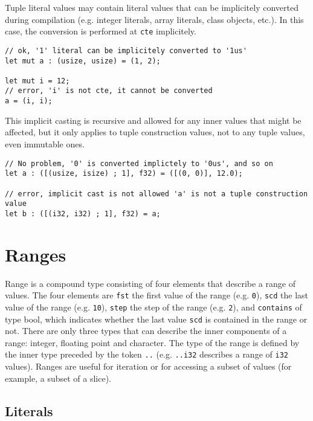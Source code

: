 Tuple literal values may contain literal values that can be implicitely converted during compilation (e.g. integer literals, array literals, class objects, etc.). In this case, the conversion is performed at \texttt{cte} implicitely.

\begin{lstlisting}[style=coloredverbatim]
// ok, '1' literal can be implicitely converted to '1us'
let mut a : (usize, usize) = (1, 2);

let mut i = 12;
// error, 'i' is not cte, it cannot be converted
a = (i, i);
\end{lstlisting}

This implicit casting is recursive and allowed for any inner values that might
be affected, but it only applies to tuple construction values, not to any tuple
values, even immutable ones.

\begin{lstlisting}[style=coloredverbatim]
// No problem, '0' is converted implictely to '0us', and so on
let a : ([(usize, isize) ; 1], f32) = ([(0, 0)], 12.0);

// error, implicit cast is not allowed 'a' is not a tuple construction value
let b : ([(i32, i32) ; 1], f32) = a;
\end{lstlisting}

\section {Ranges}%
\label{sec:range_type}

Range is a compound type consisting of four elements that describe a range of
values. The four elements are \texttt{fst} the first value of the range (e.g.
\texttt{0}), \texttt{scd} the last value of the range (e.g. \texttt{10}),
\texttt{step} the step of the range (e.g. \texttt{2}), and \texttt{contains} of
type bool, which indicates whether the last value \texttt{scd} is contained in
the range or not. There are only three types that can describe the inner
components of a range: integer, floating point and character. The type of the
range is defined by the inner type preceded by the token \texttt{..} (e.g.
\texttt{..i32} describes a range of \texttt{i32} values). Ranges are useful for
iteration or for accessing a subset of values (for example, a subset of a
slice).

\subsection {Literals}

